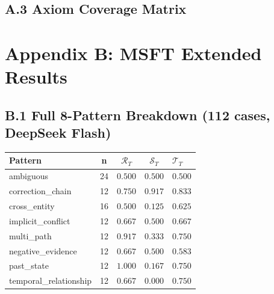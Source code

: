 \documentclass[letterpaper,twocolumn,10pt]{article}
\begin{document}
\subsection*{A.3 Axiom Coverage Matrix}
\begin{table}[h]
\centering
{}
\end{table}

\section*{Appendix B: MSFT Extended Results}
\subsection*{B.1 Full 8-Pattern Breakdown (112 cases, DeepSeek Flash)}
\begin{table}[h]
\centering\footnotesize
\begin{tabular}{lcccl}
\toprule
Pattern & n & $\mathcal{R}_T$ & $\mathcal{S}_T$ & $\mathcal{T}_T$\\
\midrule
ambiguous & 24 & $0.500$ & $0.500$ & $0.500$\\
correction\_chain & 12 & $0.750$ & $0.917$ & $0.833$\\
cross\_entity & 16 & $0.500$ & $0.125$ & $0.625$\\
implicit\_conflict & 12 & $0.667$ & $0.500$ & $0.667$\\
multi\_path & 12 & $0.917$ & $0.333$ & $0.750$\\
negative\_evidence & 12 & $0.667$ & $0.500$ & $0.583$\\
past\_state & 12 & $1.000$ & $0.167$ & $0.750$\\
temporal\_relationship & 12 & $0.667$ & $0.000$ & $0.750$\\
\bottomrule
\end{tabular}
\end{table}
\end{document}
